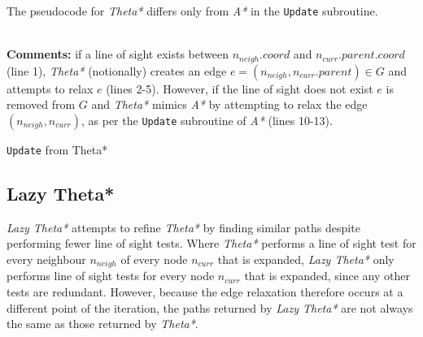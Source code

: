 \documentclass[12pt,notitlepage]{report}
\begin{document}
\noindent
The pseudocode for {\em Theta*} differs only from {\em A*} in the {\tt Update} subroutine.

\begin{algorithm}
  \SetAlgoLined\DontPrintSemicolon
  \hspace{1cm} \\
  {\bfseries Comments:} if a line of sight exists between $n_{neigh}.coord$ and $n_{curr}.parent.coord$ (line 1), {\em Theta*} (notionally) creates an edge $e = (n_{neigh}, n_{curr}.parent) \in G$ and attempts to relax $e$ (lines 2-5). However, if the line of sight does not exist $e$ is removed from $G$ and {\em Theta*} mimics {\em A*} by attempting to relax the edge $(n_{neigh},n_{curr})$, as per the {\tt Update} subroutine of {\em A*} (lines 10-13).
  \caption{{\tt Update} from {\sc Theta*}}
\end{algorithm} 

\subsection {Lazy Theta*}

{\em Lazy Theta*} attempts to refine {\em Theta*} by finding similar paths despite performing fewer line of sight tests. Where {\em Theta*} performs a line of sight test for every neighbour $n_{neigh}$ of every node $n_{curr}$ that is expanded, {\em Lazy Theta*} only performs line of sight tests for every node $n_{curr}$ that is expanded, since any other tests are redundant. However, because the edge relaxation therefore occurs at a different point of the iteration, the paths returned by {\em Lazy Theta*} are not always the same as those returned by {\em Theta*}.\\
\end{document}
